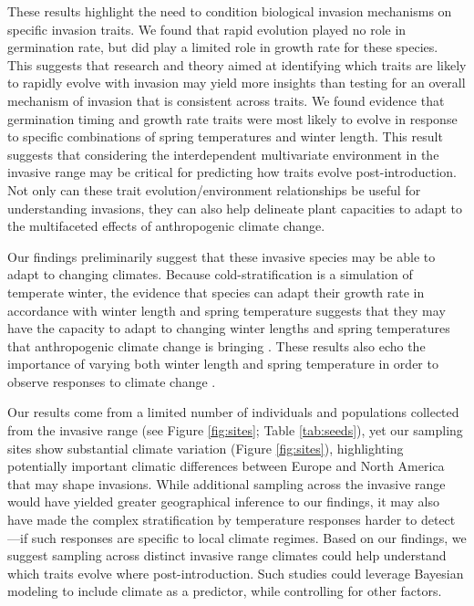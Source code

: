 \documentclass[12pt]{article}\usepackage[]{graphicx}\usepackage[]{color}
\begin{document}
	These results highlight the need to condition biological invasion mechanisms on specific invasion traits. We found that rapid evolution played no role in germination rate, but did play a limited role in growth rate for these species. This suggests that research and theory aimed at identifying which traits are likely to rapidly evolve with invasion may yield more insights than testing for an overall mechanism of invasion that is consistent across traits. We found evidence that germination timing and growth rate traits were most likely to evolve in response to specific combinations of spring temperatures and winter length. This result suggests that considering the interdependent multivariate environment in the invasive range may be critical for predicting how traits evolve post-introduction. 
Not only can these trait evolution/environment relationships be useful for understanding invasions, they can also help delineate plant capacities to adapt to the multifaceted effects of anthropogenic climate change. 
	
	Our findings preliminarily suggest that these invasive species may be able to adapt to changing climates. Because cold-stratification is a simulation of temperate winter, the evidence that species can adapt their growth rate in accordance with winter length and spring temperature suggests that they may have the capacity to adapt to changing winter lengths and spring temperatures that anthropogenic climate change is bringing \parencite{IPCC2015}. These results also echo the  importance of varying both winter length and spring temperature in order to observe responses to climate change \parencite[e.g.,][]{Bernareggi2016}. 

	Our results come from a limited number of individuals and populations collected from the invasive range (see Figure \ref{fig:sites}; Table \ref{tab:seeds}), yet our sampling sites show substantial climate variation (Figure \ref{fig:sites}), highlighting potentially important climatic differences between Europe and North America that may shape invasions. While additional sampling across the invasive range would have yielded greater geographical inference to our findings, it may also have made the complex stratification by temperature responses harder to detect---if such responses are specific to local climate regimes. Based on our findings, we suggest sampling across distinct invasive range climates could help understand which traits evolve where post-introduction. Such studies could leverage Bayesian modeling to include climate as a predictor, while controlling for other factors. 
\end{document}
